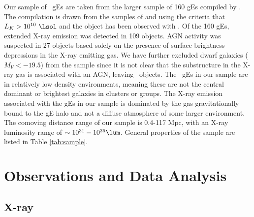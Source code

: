 \documentclass{emulateapj}
\begin{document}
Our sample of \samp\ gEs are taken from the larger sample of 160 gEs
compiled by \citet{jonesge}. The \citet{jonesge} compilation is drawn
from the samples of \citet{1999MNRAS.302..209B} and
\citet{2003MNRAS.340.1375O} using the criteria that $L_K >
10^{10}~\Lsol$ and the object has been observed with \chandra. Of the
160 gEs, extended X-ray emission was detected in 109 objects. AGN
activity was suspected in 27 objects based solely on the presence of
surface brightness depressions in the X-ray emitting gas. We have
further excluded dwarf galaxies ($M_V < -19.5$) from the sample since
it is not clear that the substructure in the X-ray gas is associated
with an AGN, leaving \samp\ objects. The \samp\ gEs in our sample are
in relatively low density environments, meaning these are not the
central dominant or brightest galaxies in clusters or groups. The
X-ray emission associated with the gEs in our sample is dominated by
the gas gravitationally bound to the gE halo and not a diffuse
atmosphere of some larger environment. The comoving distance range of
our sample is 0.4-117 Mpc, with an X-ray luminosity range of $\sim
10^{31}-10^{36} \lum$. General properties of the sample are listed in
Table \ref{tab:sample}.



\section{Observations and Data Analysis}
\label{sec:data}


\subsection{X-ray}
\label{sec:xray}
\end{document}
